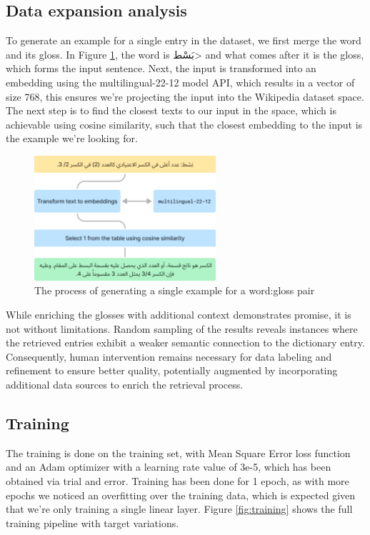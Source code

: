 \documentclass[15pt]{article}
\begin{document}
\subsection{Data expansion analysis}

To generate an example for a single entry in the dataset, we first merge the word and its gloss. In Figure \ref{fig:examples-generation}, the word is \<بَسْط> and what comes after it is the gloss, which forms the input sentence. Next, the input is transformed into an embedding using the multilingual-22-12 model API, which results in a vector of size 768, this ensures we’re projecting the input into the Wikipedia dataset space. The next step is to find the closest texts to our input in the space, which is achievable using cosine similarity, such that the closest embedding to the input is the example we’re looking for.

\begin{figure}[H]
    \centering
    \captionsetup{justification=centering}
    \includegraphics[width=0.6\textwidth]{examples-generation.png}
    \caption{The process of generating a single example for a word:gloss pair}
    \label{fig:examples-generation}
\end{figure}

While enriching the glosses with additional context demonstrates promise, it is not without limitations. Random sampling of the results reveals instances where the retrieved entries exhibit a weaker semantic connection to the dictionary entry. Consequently, human intervention remains necessary for data labeling and refinement to ensure better quality, potentially augmented by incorporating additional data sources to enrich the retrieval process.

\subsection{Training}

The training is done on the training set, with Mean Square Error loss function and an Adam optimizer with a learning rate value of 3e-5, which has been obtained via trial and error. Training has been done for 1 epoch, as with more epochs we noticed an overfitting over the training data, which is expected given that we’re only training a single linear layer. Figure \ref{fig:training} shows the full training pipeline with target variations.
\end{document}
